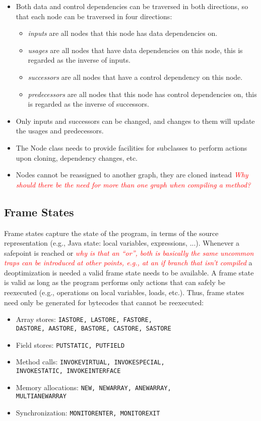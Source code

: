 \documentclass[twocolumn]{svjour3}
\newcommand{\mynote}[2]{
\textcolor{red}{\fbox{\bfseries\sffamily\scriptsize#1}
  {\small\textsf{\emph{#2}}}
\fbox{\bfseries\sffamily\scriptsize }}}
\newcommand\cw[1]{\mynote{CW}{#1}}
\newcommand\ls[1]{\mynote{LS}{#1}}
\begin{document}
\begin{itemize}
    \item Both data and control dependencies can be traversed in both directions, so that each node can be traversed in four directions:
    \begin{itemize}
        \item \emph{inputs} are all nodes that this node has data dependencies on.
        \item \emph{usages} are all nodes that have data dependencies on this node, this is regarded as the inverse of inputs.
        \item \emph{successors} are all nodes that have a control dependency on this node.
        \item \emph{predecessors} are all nodes that this node has control dependencies on, this is regarded as the inverse of successors.
    \end{itemize}
    \item Only inputs and successors can be changed, and changes to them will update the usages and predecessors.
    \item The Node class needs to provide facilities for subclasses to perform actions upon cloning, dependency changes, etc.
    \item Nodes cannot be reassigned to another graph, they are cloned instead \cw{Why should there be the need for more than one graph when compiling a method?}
\end{itemize}

\subsection{Frame States}
Frame states capture the state of the program, in terms of the source representation (e.g., Java state: local variables, expressions, ...).
Whenever a safepoint is reached or \cw{why is that an ``or'', both is basically the same} \ls{uncommon traps can be introduced at other points, e.g., at an if branch that isn't compiled} a deoptimization is needed a valid frame state needs to be available.
A frame state is valid as long as the program performs only actions that can safely be reexecuted (e.g., operations on local variables, loads, etc.).
Thus, frame states need only be generated for bytecodes that cannot be reexecuted:

\begin{itemize}
    \item Array stores: {\tt IASTORE, LASTORE, FASTORE, \\DASTORE, AASTORE, BASTORE, CASTORE, SASTORE}
    \item Field stores: {\tt PUTSTATIC, PUTFIELD}
    \item Method calls: {\tt INVOKEVIRTUAL, INVOKESPECIAL, \\INVOKESTATIC, INVOKEINTERFACE}
    \item Memory allocations: {\tt NEW, NEWARRAY, ANEWARRAY, \\MULTIANEWARRAY}
    \item Synchronization: {\tt MONITORENTER, MONITOREXIT}
\end{itemize}
\end{document}
